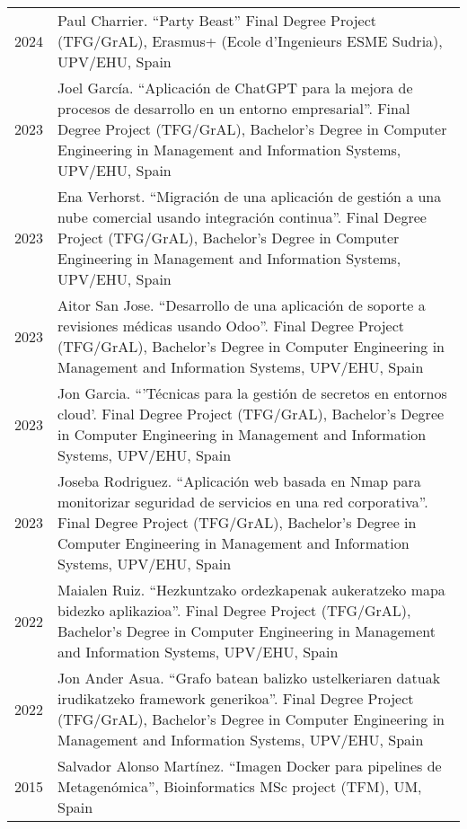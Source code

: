\documentclass[11pt,fullpage]{article}
\begin{document}
\begin{longtable}{p{0.5in}|p{5.5in}}
2024 & Paul Charrier. ``Party Beast'' Final Degree Project (TFG/GrAL), Erasmus+ (Ecole d'Ingenieurs ESME Sudria), UPV/EHU, Spain \\
2023 & Joel García. ``Aplicación de ChatGPT para la mejora de procesos de desarrollo en un entorno empresarial''. Final Degree Project (TFG/GrAL), Bachelor's Degree in Computer Engineering in Management and Information Systems, UPV/EHU, Spain \\
2023 & Ena Verhorst. ``Migración de una aplicación de gestión a una nube comercial usando integración continua''. Final Degree Project (TFG/GrAL), Bachelor's Degree in Computer Engineering in Management and Information Systems, UPV/EHU, Spain \\
2023 & Aitor San Jose. ``Desarrollo de una aplicación de soporte a revisiones médicas usando Odoo''. Final Degree Project (TFG/GrAL), Bachelor's Degree in Computer Engineering in Management and Information Systems, UPV/EHU, Spain \\
2023 & Jon Garcia. ``'Técnicas para la gestión de secretos en entornos cloud'. Final Degree Project (TFG/GrAL), Bachelor's Degree in Computer Engineering in Management and Information Systems, UPV/EHU, Spain \\
2023 & Joseba Rodriguez. ``Aplicación web basada en Nmap para monitorizar seguridad de servicios en una red corporativa''. Final Degree Project (TFG/GrAL), Bachelor's Degree in Computer Engineering in Management and Information Systems, UPV/EHU, Spain \\
2022 & Maialen Ruiz. ``Hezkuntzako ordezkapenak aukeratzeko mapa bidezko aplikazioa''. Final Degree Project (TFG/GrAL), Bachelor's Degree in Computer Engineering in Management and Information Systems, UPV/EHU, Spain \\
2022 & Jon Ander Asua. ``Grafo batean balizko ustelkeriaren datuak irudikatzeko framework generikoa''. Final Degree Project (TFG/GrAL), Bachelor's Degree in Computer Engineering in Management and Information Systems, UPV/EHU, Spain \\
2015 & Salvador Alonso Mart\'inez. ``Imagen Docker para pipelines de Metagen\'omica'', Bioinformatics MSc project (TFM), UM, Spain \\

\end{longtable}
\end{document}
